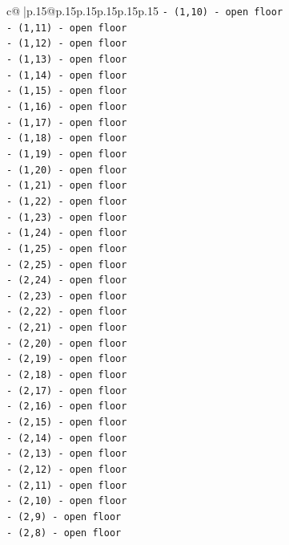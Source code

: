 \documentclass{article}
\begin{document}
{\begin{supertabular}{c@{$\;$}|p{.15\linewidth}@{}p{.15\linewidth}p{.15\linewidth}p{.15\linewidth}p{.15\linewidth}p{.15\linewidth}}
{{{\texttt{{-} (1,10) {-} open floor} \\
\texttt{{-} (1,11) {-} open floor} \\
\texttt{{-} (1,12) {-} open floor} \\
\texttt{{-} (1,13) {-} open floor} \\
\texttt{{-} (1,14) {-} open floor} \\
\texttt{{-} (1,15) {-} open floor} \\
\texttt{{-} (1,16) {-} open floor} \\
\texttt{{-} (1,17) {-} open floor} \\
\texttt{{-} (1,18) {-} open floor} \\
\texttt{{-} (1,19) {-} open floor} \\
\texttt{{-} (1,20) {-} open floor} \\
\texttt{{-} (1,21) {-} open floor} \\
\texttt{{-} (1,22) {-} open floor} \\
\texttt{{-} (1,23) {-} open floor} \\
\texttt{{-} (1,24) {-} open floor} \\
\texttt{{-} (1,25) {-} open floor} \\
\texttt{{-} (2,25) {-} open floor} \\
\texttt{{-} (2,24) {-} open floor} \\
\texttt{{-} (2,23) {-} open floor} \\
\texttt{{-} (2,22) {-} open floor} \\
\texttt{{-} (2,21) {-} open floor} \\
\texttt{{-} (2,20) {-} open floor} \\
\texttt{{-} (2,19) {-} open floor} \\
\texttt{{-} (2,18) {-} open floor} \\
\texttt{{-} (2,17) {-} open floor} \\
\texttt{{-} (2,16) {-} open floor} \\
\texttt{{-} (2,15) {-} open floor} \\
\texttt{{-} (2,14) {-} open floor} \\
\texttt{{-} (2,13) {-} open floor} \\
\texttt{{-} (2,12) {-} open floor} \\
\texttt{{-} (2,11) {-} open floor} \\
\texttt{{-} (2,10) {-} open floor} \\
\texttt{{-} (2,9) {-} open floor} \\
\texttt{{-} (2,8) {-} open floor} \\
}}}
\end{supertabular}}
\end{document}
